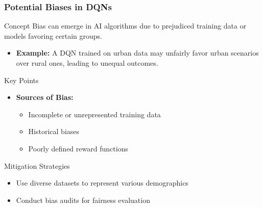 \documentclass[aspectratio=169]{beamer}
\begin{document}
\begin{frame}[fragile]
    \frametitle{Potential Biases in DQNs}
    \begin{block}{Concept}
        Bias can emerge in AI algorithms due to prejudiced training data or models favoring certain groups.
    \end{block}
    
    \begin{itemize}
        \item \textbf{Example:} A DQN trained on urban data may unfairly favor urban scenarios over rural ones, leading to unequal outcomes.
    \end{itemize}
    
    \begin{block}{Key Points}
        \begin{itemize}
            \item \textbf{Sources of Bias:}
            \begin{itemize}
                \item Incomplete or unrepresented training data
                \item Historical biases
                \item Poorly defined reward functions
            \end{itemize}
        \end{itemize}
    \end{block}

    \begin{block}{Mitigation Strategies}
        \begin{itemize}
            \item Use diverse datasets to represent various demographics
            \item Conduct bias audits for fairness evaluation
        \end{itemize}
    \end{block}
\end{frame}
\end{document}
